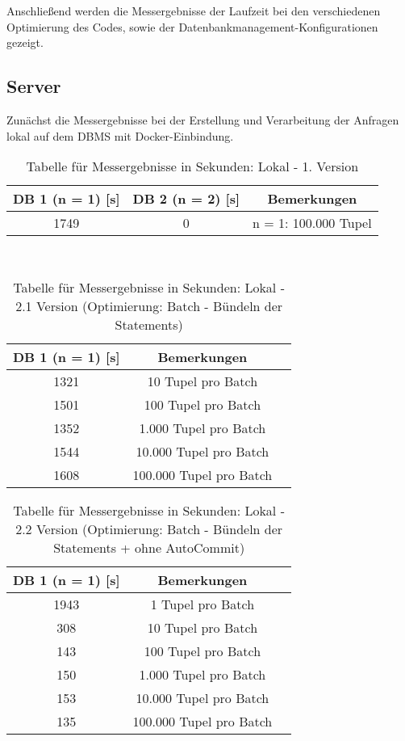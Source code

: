 Anschließend werden die Messergebnisse der Laufzeit bei den verschiedenen Optimierung des Codes, sowie der Datenbankmanagement-Konfigurationen gezeigt.

\subsection{Server}\label{subsec:server}
Zunächst die Messergebnisse bei der Erstellung und Verarbeitung der Anfragen lokal auf dem DBMS mit Docker-Einbindung.
\begin{table}[h!]
    \centering
    \begin{tabular}{|c|c|c|}
        \hline
        DB 1 (n = 1) [s] & DB 2 (n = 2) [s] & Bemerkungen \\  \hline
        1749 & 0 & n = 1: 100.000 Tupel \\ \hline
    \end{tabular}
    \caption{Tabelle für Messergebnisse in Sekunden: Lokal - 1. Version}
    \label{tab:5}
\end{table} \\

\begin{table}[h!]
    \centering
    \begin{tabular}{|c|c|c|}
        \hline
        DB 1 (n = 1) [s] & Bemerkungen \\  \hline
        1321 & 10 Tupel pro Batch \\ \hline
        1501 & 100 Tupel pro Batch \\ \hline
        1352 & 1.000 Tupel pro Batch \\ \hline
        1544 & 10.000 Tupel pro Batch \\ \hline
        1608 & 100.000 Tupel pro Batch \\ \hline
    \end{tabular}
    \caption{Tabelle für Messergebnisse in Sekunden: Lokal - 2.1 Version (Optimierung: Batch - Bündeln der Statements)}
    \label{tab:6}
\end{table}

\begin{table}[h!]
    \centering
    \begin{tabular}{|c|c|c|}
        \hline
        DB 1 (n = 1) [s] & Bemerkungen \\  \hline
        1943 & 1 Tupel pro Batch \\ \hline
        308 & 10 Tupel pro Batch \\ \hline
        143 & 100 Tupel pro Batch \\ \hline
        150 & 1.000 Tupel pro Batch \\ \hline
        153 & 10.000 Tupel pro Batch \\ \hline
        135 & 100.000 Tupel pro Batch \\ \hline
    \end{tabular}
    \caption{Tabelle für Messergebnisse in Sekunden: Lokal - 2.2 Version (Optimierung: Batch - Bündeln der Statements + ohne AutoCommit)}
    \label{tab:7}
\end{table}

